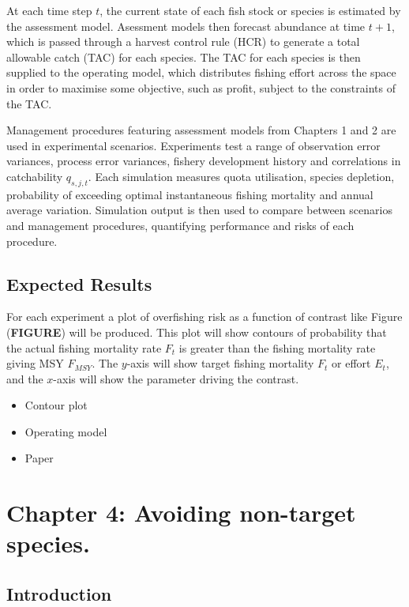 \documentclass[12pt,]{scrartcl}
\providecommand{\tightlist}{%
  \setlength{\itemsep}{0pt}\setlength{\parskip}{0pt}}
\begin{document}
At each time step \(t\), the current state of each fish stock or species
is estimated by the assessment model. Asessment models then forecast
abundance at time \(t+1\), which is passed through a harvest control
rule (HCR) to generate a total allowable catch (TAC) for each species.
The TAC for each species is then supplied to the operating model, which
distributes fishing effort across the space in order to maximise some
objective, such as profit, subject to the constraints of the TAC.

Management procedures featuring assessment models from Chapters 1 and 2
are used in experimental scenarios. Experiments test a range of
observation error variances, process error variances, fishery
development history and correlations in catchability \(q_{s,j,t}\). Each
simulation measures quota utilisation, species depletion, probability of
exceeding optimal instantaneous fishing mortality and annual average
variation. Simulation output is then used to compare between scenarios
and management procedures, quantifying performance and risks of each
procedure.

\subsection{Expected Results}\label{expected-results-2}

For each experiment a plot of overfishing risk as a function of contrast
like Figure (\textbf{FIGURE}) will be produced. This plot will show
contours of probability that the actual fishing mortality rate \(F_t\)
is greater than the fishing mortality rate giving MSY \(F_{MSY}\). The
\(y\)-axis will show target fishing mortality \(F_t\) or effort \(E_t\),
and the \(x\)-axis will show the parameter driving the contrast.

\begin{itemize}
\tightlist
\item
  Contour plot
\item
  Operating model
\item
  Paper
\end{itemize}

\section{Chapter 4: Avoiding non-target
species.}\label{chapter-4-avoiding-non-target-species.}

\subsection{Introduction}\label{introduction-1}
\end{document}
